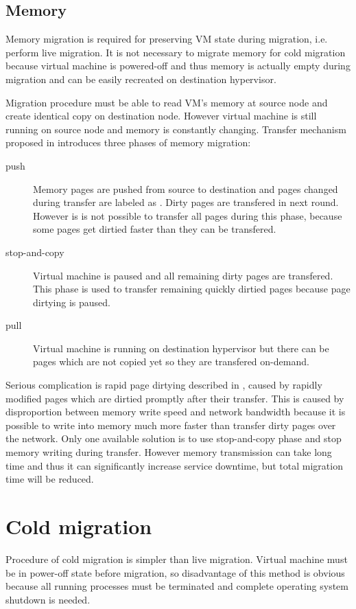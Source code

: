 \subsection{Memory}
Memory migration is required for preserving \Ac{VM} state during migration, i.e. perform live migration. It is not necessary to migrate memory for cold migration because virtual machine is powered-off and thus memory is actually empty during migration and can be easily recreated on destination hypervisor. 

Migration procedure must be able to read \Ac{VM}'s memory at source node and create identical copy on destination node. However virtual machine is still running on source node and memory is constantly changing. Transfer mechanism proposed in \cite{live-migration-of-vms} introduces three phases of memory migration:
\begin{description}
	\item[push] Memory pages are pushed from source to destination and pages changed during transfer are labeled as . Dirty pages are transfered in next round. However is is not possible to transfer all pages during this phase, because some pages get dirtied faster than they can be transfered.
	\item[stop-and-copy] Virtual machine is paused and all remaining dirty pages are transfered. This phase is used to transfer remaining quickly dirtied pages because page dirtying is paused.
	\item[pull] Virtual machine is running on destination hypervisor but there can be pages which are not copied yet so they are transfered on-demand.
\end{description}

Serious complication is rapid page dirtying described in \cite{live-migration-of-vms}, caused by rapidly modified pages which are dirtied promptly after their transfer. This is caused by disproportion between memory write speed and network bandwidth because it is possible to write into memory much more faster than transfer dirty pages over the network. Only one available solution is to use stop-and-copy phase and stop memory writing during transfer. However memory transmission can take long time and thus it can significantly increase service downtime, but total migration time will be reduced.

\section{Cold migration}
Procedure of cold migration is simpler than live migration. Virtual machine must be in power-off state before migration, so disadvantage of this method is obvious because all running processes must be terminated and complete operating system shutdown is needed.

